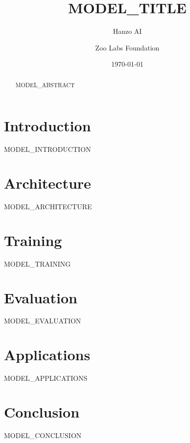 \documentclass{article}
\title{MODEL_TITLE}
\author{Hanzo AI \and Zoo Labs Foundation}
\date{\today}
\begin{document}
\maketitle

\begin{abstract}
MODEL_ABSTRACT
\end{abstract}

\section{Introduction}
MODEL_INTRODUCTION

\section{Architecture}
MODEL_ARCHITECTURE

\section{Training}
MODEL_TRAINING

\section{Evaluation}
MODEL_EVALUATION

\section{Applications}
MODEL_APPLICATIONS

\section{Conclusion}
MODEL_CONCLUSION



\end{document}
